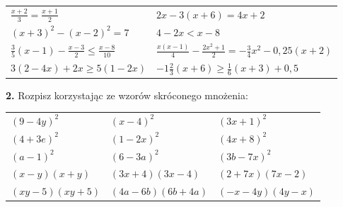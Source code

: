 \documentclass[12pt,a4paper]{article}
\theoremstyle{break}
\begin{document}
	\begin{enumerate}[a)] \begin{tabular}{p{7cm} p{7cm}} 
		\item $\frac{x+2}{3}=\frac{x+1}{2}$ & \vspace{0.25cm} 	\item$2x-3(x+6)=4x+2$ \\
		\item $(x+3)^2-(x-2)^2=7$ & 
		\item $4-2x<x-8$ \\
		\item $\frac{3}{5}(x-1)-\frac{x-3}{2}\leq\frac{x-8}{10} $ & 
		\item $\frac{x(x-1)}{4}-\frac{2x^2+1}{2}=-\frac{3}{4}x^2-0,25(x+2)$ \\
		\item $3(2-4x)+2x\geq5(1-2x)$ & 
		\item $-1\frac{2}{3}(x+6)\geq\frac{1}{6}(x+3)+0,5$ \\
	\end{tabular} \end{enumerate}

\begin{mdframed}[style=zad]
		\vspace{0.2cm}
		\textbf{2.} Rozpisz korzystając ze wzorów skróconego mnożenia:
	\end{mdframed}
	
	\begin{enumerate}[a)] \begin{tabular}{p{5cm} p{5cm} p{5cm}} 
		\item $(9-4y)^2$ & \vspace{0.25cm}\item$(x-4)^2$ &\vspace{0.25cm}\item $(3x+1)^2$\\
		\item $(4+3e)^2$ & \item $(1-2x)^2$ &\item $(4x+8)^2$\\
		\item $(a-1)^2$ & \item $(6-3a)^2$ &\item $(3b-7x)^2$\\
		\item $(x-y)(x+y)$ & \item $(3x+4)(3x-4)$ &\item $(2+7x)(7x-2)$\\
		\item $(xy-5)(xy+5)$ & \item $(4a-6b)(6b+4a)$ &\item $(-x-4y)(4y-x)$\\
\end{tabular} \end{enumerate}
\end{document}
